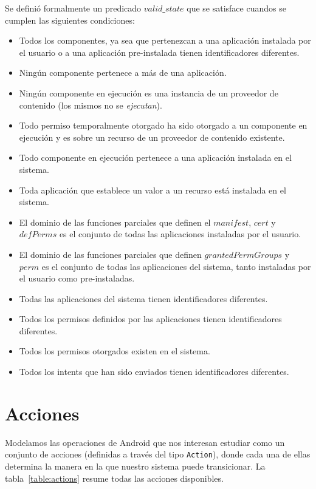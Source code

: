 Se definió formalmente un predicado $valid\_state$ que se satisface cuandos se cumplen las
siguientes condiciones:

\begin{itemize}
    \item Todos los componentes, ya sea que pertenezcan a una aplicación instalada por el usuario o
          a una aplicación pre-instalada tienen identificadores diferentes.
    \item Ningún componente pertenece a más de una aplicación.
    \item Ningún componente en ejecución es una instancia de un proveedor de contenido (los mismos
          no se \textit{ejecutan}).
    \item Todo permiso temporalmente otorgado ha sido otorgado a un componente en ejecución y es
          sobre un recurso de un proveedor de contenido existente.
    \item Todo componente en ejecución pertenece a una aplicación instalada en el sistema.
    \item Toda aplicación que establece un valor a un recurso está instalada en el sistema.
    \item El dominio de las funciones parciales que definen el $manifest$, $cert$ y $defPerms$ es el
          conjunto de todas las aplicaciones instaladas por el usuario.
    \item El dominio de las funciones parciales que definen $grantedPermGroups$ y $perm$ es el
          conjunto de todas las aplicaciones del sistema, tanto instaladas por el usuario como
          pre-instaladas.
    \item Todas las aplicaciones del sistema tienen identificadores diferentes.
    \item Todos los permisos definidos por las aplicaciones tienen identificadores diferentes.
    \item Todos los permisos otorgados existen en el sistema.
    \item Todos los intents que han sido enviados tienen identificadores diferentes.
\end{itemize}

\section{Acciones}
Modelamos las operaciones de Android que nos interesan estudiar como un conjunto de acciones
(definidas a través del tipo \texttt{Action}), donde cada una de ellas determina la manera en la que
nuestro sistema puede transicionar.  La tabla~\ref{table:actions} resume todas las acciones
disponibles.

